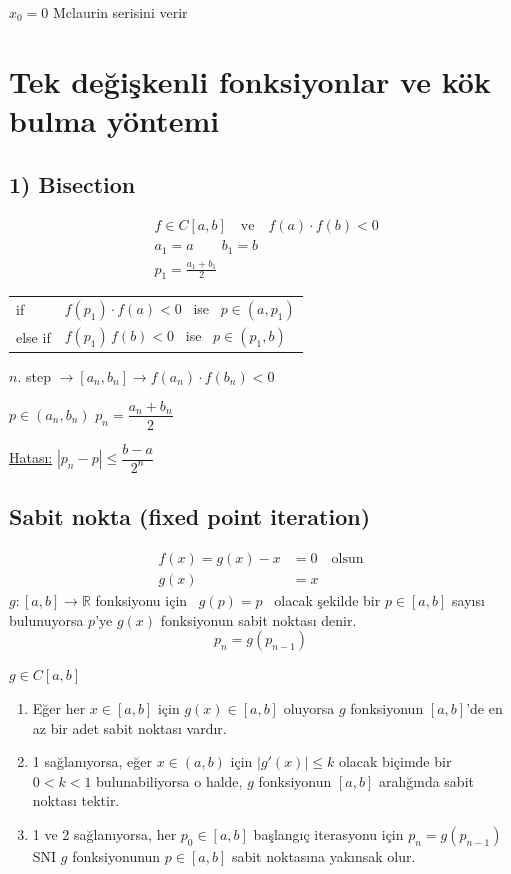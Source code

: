 \documentclass[11pt,a4paper]{article}
\begin{document}
$x_0 = 0$ \quad Mclaurin serisini verir

\section{Tek değişkenli fonksiyonlar ve kök bulma yöntemi}
\subsection{1) Bisection}
\begin{align*}
  & f \in C[a,b] \quad \text{ve} \quad f(a) \cdot f(b) < 0 \\
  & a_1 = a \qquad b_1 = b \\
  & p_1 = \frac{a_1 + b_1}{2}
\end{align*}
\begin{tabular}{@{}ll@{}}
  if & $f(p_1) \cdot f(a) < 0$ \ ise \ $p \in (a, p_1)$ \\
  else if & $f(p_1)\, f(b) < 0$ \ ise \ $p \in (p_1, b)$
\end{tabular}

\medskip
$n$. step $\rightarrow [a_n, b_n] \rightarrow f(a_n) \cdot f(b_n) < 0$

\qquad $p \in (a_n, b_n)$ \qquad $p_n = \dfrac{a_n + b_n}{2}$

\underline{Hatası:} \qquad $|p_n - p| \le \dfrac{b-a}{2^n}$

\subsection{Sabit nokta (fixed point iteration)}
\begin{align*}
  f(x) = g(x) - x &= 0 \quad \text{olsun} \\
  g(x) &= x
\end{align*}
$g : [a,b] \rightarrow \mathbb{R}$ fonksiyonu için \ $g(p) = p$ \ olacak şekilde bir $p \in [a,b]$
sayısı bulunuyorsa $p$'ye $g(x)$ fonksiyonun sabit noktası denir.
\[ p_n = g(p_{n-1}) \]

\begin{teorem}
  $g \in C[a,b]$
  \begin{enumerate}[label=\arabic*)]
    \item Eğer her $x \in [a,b]$ için $g(x) \in [a,b]$ oluyorsa $g$ fonksiyonun $[a,b]$'de en az
      bir adet sabit noktası vardır.
    \item 1 sağlanıyorsa, eğer $x \in (a,b)$ için $|g'(x)| \le k$ olacak biçimde bir
      $0 < k < 1$ bulunabiliyorsa o halde, $g$ fonksiyonun $[a,b]$ aralığında sabit noktası tektir.
    \item 1 ve 2 sağlanıyorsa, her $p_0 \in [a,b]$ başlangıç iterasyonu için $p_n = g(p_{n-1})$
      SNI $g$ fonksiyonunun $p \in [a,b]$ sabit noktasına yakınsak olur.
  \end{enumerate}
\end{teorem}
\end{document}
